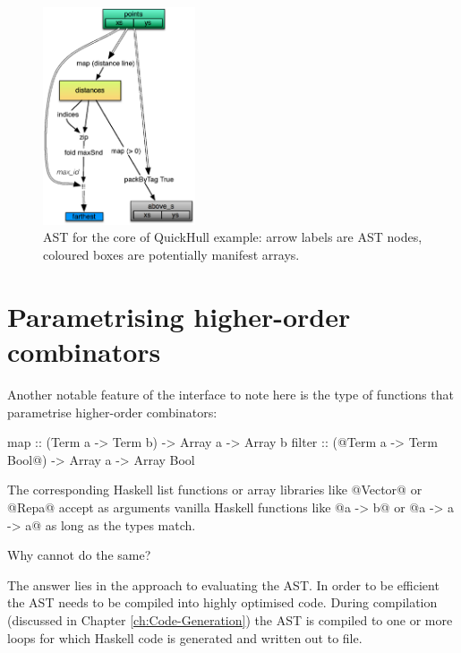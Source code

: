 \documentclass[preamble.tex]{subfiles}
\begin{document}
\begin{figure}
\includegraphics[width=0.4\textwidth,center]{img/QuickHull-flat-but-true}
\caption{\label{fig:QuickHull-flat}{AST for the core of QuickHull example: arrow labels are AST nodes, coloured boxes are potentially manifest arrays.}}
\end{figure}




\section{Parametrising higher-order combinators}

Another notable feature of the interface to note here is the type of functions that parametrise higher-order combinators:

\begin{hscode}
map    :: (Term a -> Term b) -> Array a -> Array b
filter :: (@Term a -> Term Bool@) -> Array a -> Array Bool
\end{hscode}

The corresponding Haskell list functions or array libraries like @Vector@ or @Repa@ \cite{KCL+10} accept as arguments vanilla Haskell functions like @a -> b@ or @a -> a -> a@ as long as the types match.

Why cannot \LiveFusion do the same?

The answer lies in the approach to evaluating the AST. In order to be efficient the AST needs to be compiled into highly optimised code. During compilation (discussed in Chapter \ref{ch:Code-Generation}) the AST is compiled to one or more loops for which Haskell code is generated and written out to file.
\end{document}
